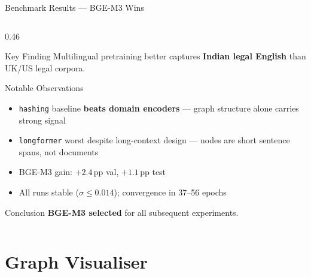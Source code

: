 \documentclass[aspectratio=169, 9pt]{beamer}
\begin{document}
\begin{frame}{Benchmark Results — BGE-M3 Wins}
\begin{columns}[T]
\begin{column}{0.46\textwidth}
\begin{alertblock}{Key Finding}
        Multilingual pretraining better captures \textbf{Indian legal English} than UK/US legal corpora.
      \end{alertblock}
      \vspace{6pt}
      \begin{block}{Notable Observations}
        \small
        \begin{itemize}\setlength\itemsep{3pt}
          \item \texttt{hashing} baseline \textbf{beats domain encoders} — graph structure alone carries strong signal
          \item \texttt{longformer} worst despite long-context design — nodes are short sentence spans, not documents
          \item BGE-M3 gain: $+2.4$\,pp val, $+1.1$\,pp test
          \item All runs stable ($\sigma \leq 0.014$); convergence in 37--56 epochs
        \end{itemize}
      \end{block}
      \vspace{4pt}
      \begin{block}{Conclusion}
        \small\textbf{BGE-M3 selected} for all subsequent experiments.
      \end{block}
    \end{column}
  \end{columns}
\end{frame}

\section{Graph Visualiser}
\end{document}
